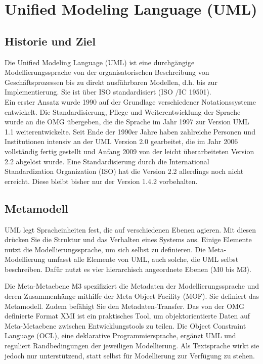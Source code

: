 
\section{Unified Modeling Language (UML)}

\subsection{Historie und Ziel}
Die Unified Modeling Language (UML) ist eine durchgängige Modellierungssprache von der
organisatorischen Beschreibung von Geschäftsprozessen bis zu direkt ausführbaren Modellen,
d.h. bis zur Implementierung. Sie ist über ISO standardisiert (ISO /IC 19501).\\
Ein erster Ansatz wurde 1990 auf der Grundlage verschiedener Notationssysteme entwickelt.
Die Standardisierung, Pflege und Weiterentwicklung der Sprache wurde an die OMG
übergeben, die die Sprache im Jahr 1997 zur Version UML 1.1 weiterentwickelte. Seit Ende der
1990er Jahre haben zahlreiche Personen und Institutionen intensiv an der UML Version 2.0
gearbeitet, die im Jahr 2006 vollständig fertig gestellt und Anfang 2009 von der leicht
überarbeiteten Version 2.2 abgelöst wurde. Eine Standardisierung durch die International
Standardization Organization (ISO) hat die Version 2.2 allerdings noch nicht erreicht. Diese
bleibt bisher nur der Version 1.4.2 vorbehalten.
\cite{MT005}
\subsection{Metamodell} 
UML legt Spracheinheiten fest, die auf verschiedenen Ebenen agieren. Mit diesen drücken Sie die Struktur und das Verhalten eines Systems aus. Einige Elemente nutzt die Modellierungssprache, um sich selbst zu definieren. Die Meta-Modellierung umfasst alle Elemente von UML, auch solche, die UML selbst beschreiben. Dafür nutzt es vier hierarchisch angeordnete Ebenen (M0 bis M3).

Die Meta-Metaebene M3 spezifiziert die Metadaten der Modellierungssprache und deren Zusammenhänge mithilfe der Meta Object Facility (MOF). Sie definiert das Metamodell. Zudem befähigt Sie den Metadaten-Transfer. Das von der OMG definierte Format XMI ist ein praktisches Tool, um objektorientierte Daten auf Meta-Metaebene zwischen Entwicklungstools zu teilen. Die Object Constraint Language (OCL), eine deklarative Programmiersprache, ergänzt UML und reguliert Randbedingungen der jeweiligen Modellierung. Als Textsprache wirkt sie jedoch nur unterstützend, statt selbst für Modellierung zur Verfügung zu stehen.\cite{MT011}\\

